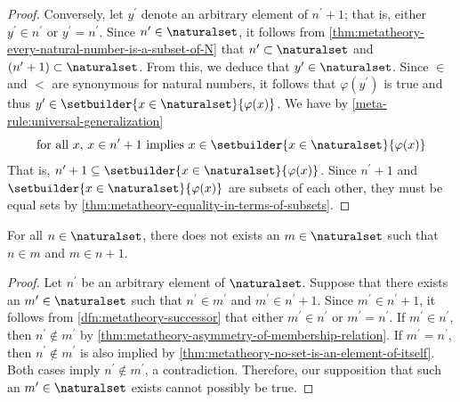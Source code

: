 \begin{proof}
    \vspace{0.3cm}
    \noindent
    Conversely, let \( y^{\prime} \) denote an arbitrary element of \( n^{\prime} + 1 \); that is, either \( y^{\prime} \in n^{\prime} \) or \( y^{\prime} = n^{\prime} \).
    Since \( n^{\prime} \in \naturalset \), it follows from \cref{thm:metatheory-every-natural-number-is-a-subset-of-N} that \( n^{\prime} \subset \naturalset \)
    and \( \mleft( n^{\prime} + 1 \mright) \subset \naturalset \).
    From this, we deduce that \( y^{\prime} \in \naturalset \).
    Since \( \in \) and \( < \) are synonymous for natural numbers,
    it follows that \( \varphi(y^{\prime}) \) is true and thus \( y^{\prime} \in \setbuilder{x \in \naturalset}{\varphi(x)} \).
    We have by \cref{meta-rule:universal-generalization}
    \begin{equation*}
        \text{for all \( x \), \( x \in n^{\prime} + 1 \) implies \( x \in \setbuilder{x \in \naturalset}{\varphi(x)} \)}
    \end{equation*}
    That is, \( n^{\prime} + 1 \subseteq \setbuilder{x \in \naturalset}{\varphi(x)} \).
    Since \( n^{\prime} + 1 \) and \( \setbuilder{x \in \naturalset}{\varphi(x)} \) are subsets of each other, they must be equal sets
    by \cref{thm:metatheory-equality-in-terms-of-subsets}.
\end{proof}

\begin{thm}
     \label{thm:metatheory-there-is-nothing-in-between-a-natural-number-and-its-successor}
    For all \( n \in \naturalset \), there does not exists an \( m \in \naturalset \) such that \( n \in m \) and \( m \in n + 1 \).
\end{thm}

\begin{proof}
    Let \( n^{\prime} \) be an arbitrary element of \( \naturalset \).
    Suppose that there exists an \( m^{\prime} \in \naturalset \) such that \( n^{\prime} \in m^{\prime} \) and \( m^{\prime} \in n^{\prime} + 1 \).
    Since \( m^{\prime} \in n^{\prime} + 1 \), it follows from \cref{dfn:metatheory-successor} that either \( m^{\prime} \in n^{\prime} \) or \( m^{\prime} = n^{\prime} \).
    If \( m^{\prime} \in n^{\prime} \), then \( n^{\prime} \notin m^{\prime} \) by \cref{thm:metatheory-asymmetry-of-membership-relation}.
    If \( m^{\prime} = n^{\prime} \), then \( n^{\prime} \notin m^{\prime} \) is also implied by \cref{thm:metatheory-no-set-is-an-element-of-itself}.
    Both cases imply \( n^{\prime} \notin m^{\prime} \), a contradiction.
    Therefore, our supposition that such an \( m^{\prime} \in \naturalset \) exists cannot possibly be true.
\end{proof}

